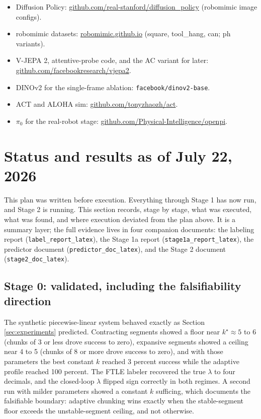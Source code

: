 \documentclass[11pt]{article}
\newcommand{\kstar}{k^{\star}}
\begin{document}
\begin{itemize}[leftmargin=2em]
  \item Diffusion Policy: \url{github.com/real-stanford/diffusion_policy}
        (robomimic image configs).
  \item robomimic datasets: \url{robomimic.github.io}
        (square, tool\_hang, can; ph variants).
  \item V-JEPA 2, attentive-probe code, and the AC variant for later:\\
        \url{github.com/facebookresearch/vjepa2}.
  \item DINOv2 for the single-frame ablation: \texttt{facebook/dinov2-base}.
  \item ACT and ALOHA sim: \url{github.com/tonyzhaozh/act}.
  \item $\pi_0$ for the real-robot stage:
        \url{github.com/Physical-Intelligence/openpi}.
\end{itemize}

\section{Status and results as of July 22, 2026}
\label{sec:status}

This plan was written before execution. Everything through Stage 1 has now run,
and Stage 2 is running. This section records, stage by stage, what was
executed, what was found, and where execution deviated from the plan above. It
is a summary layer; the full evidence lives in four companion documents:
the labeling report (\texttt{label\_report\_latex}), the Stage 1a report
(\texttt{stage1a\_report\_latex}), the predictor document
(\texttt{predictor\_doc\_latex}), and the Stage 2 document
(\texttt{stage2\_doc\_latex}).

\subsection{Stage 0: validated, including the falsifiability direction}

The synthetic piecewise-linear system behaved exactly as Section
\ref{sec:experiments} predicted. Contracting segments showed a floor near
$\kstar \approx 5$ to $6$ (chunks of 3 or less drove success to zero), expansive
segments showed a ceiling near 4 to 5 (chunks of 8 or more drove success to
zero), and with those parameters the best constant $k$ reached 3 percent
success while the adaptive profile reached 100 percent. The FTLE labeler
recovered the true $\lambda$ to four decimals, and the closed-loop $\lambda$
flipped sign correctly in both regimes. A second run with milder parameters
showed a constant $k$ sufficing, which documents the falsifiable boundary:
adaptive chunking wins exactly when the stable-segment floor exceeds the
unstable-segment ceiling, and not otherwise.
\end{document}
